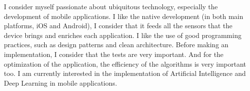 \documentclass[8pt]{developercv} %
\begin{document}
\vspace{0.5cm}



\begin{minipage}[t]{0.4\textwidth} %
	\vspace{-\baselineskip} %
	I consider myself passionate about ubiquitous technology, especially the development of mobile applications.
I like the native development (in both main platforms, iOS and Android), I consider that it feeds all the sensors that the device brings and enriches each application.
I like the use of good programming practices, such as design patterns and clean architecture. Before making an implementation, I consider that the tests are very important. And for the optimization of the application, the efficiency of the algorithms is very important too.
I am currently interested in the implementation of Artificial Intelligence and Deep Learning in mobile applications.
\end{minipage}
\hfill %
\begin{minipage}[t]{0.5\textwidth} %
	\vspace{-\baselineskip} %
	\begin{barchart}{5.5}
	\end{barchart}
\end{minipage}

\begin{center}
\end{center}


\end{document}

